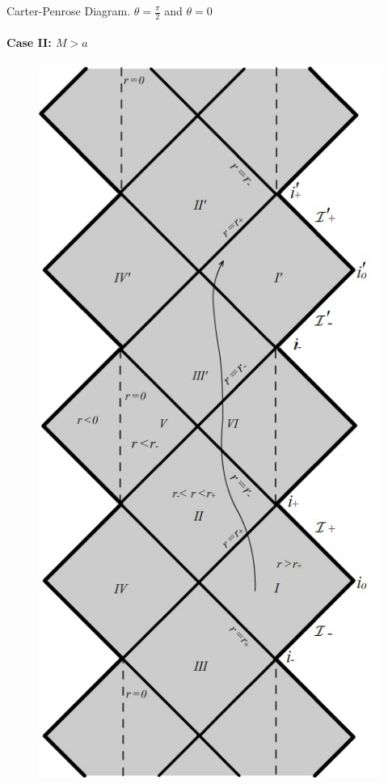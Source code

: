 \documentclass{beamer}
\begin{document}
        
        \begin{frame}{Carter-Penrose Diagram. $\theta=\frac{\pi}{2}$ and $\theta=0$}
         \framesubtitle{Case II: $M>a$}

        	\begin{center}
				\begin{figure}
				\includegraphics[scale=0.75] {figures/fig38.jpg}
				\end{figure}
			\end{center}	
        \end{frame}
\end{document}
